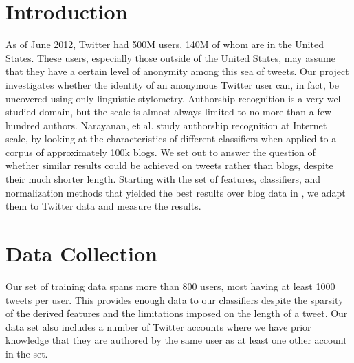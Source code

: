 \documentclass[10pt, conference, compsocconf]{IEEEtran}
\begin{document}




%
\IEEEpeerreviewmaketitle



\section{Introduction}
As of June 2012, Twitter had 500M users, 140M of whom are in the
United States. These users, especially those outside of the United
States, may assume that they have a certain level of anonymity among
this sea of tweets. Our project investigates whether the identity of
an anonymous Twitter user can, in fact, be uncovered using only
linguistic stylometry. Authorship recognition is a very well-studied
domain, but the scale is almost always limited to no more than a few
hundred authors. Narayanan, et al.\cite{Narayanan} study authorship
recognition at Internet scale, by looking at the characteristics of
different classifiers when applied to a corpus of approximately 100k
blogs. We set out to answer the question of whether similar results
could be achieved on tweets rather than blogs, despite their much
shorter length. Starting with the set of features, classifiers, and
normalization methods that yielded the best results over blog data in
\cite{Narayanan}, we adapt them to Twitter data and measure the results.

\section{Data Collection}
Our set of training data spans more than 800 users, most having at
least 1000 tweets per user. This provides enough data to our
classifiers despite the sparsity of the derived features and the
limitations imposed on the length of a tweet. Our data set also
includes a number of Twitter accounts where we have prior knowledge
that they are authored by the same user as at least one other account
in the set.
\end{document}
